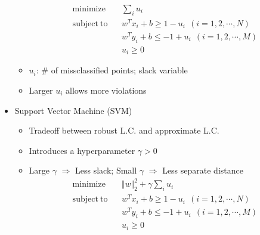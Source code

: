 \begin{itemize}
\begin{itemize}
\begin{equation}
\begin{aligned}
            \mathrm{minimize}~~&~~\sum_{i}u_i \\
            \mathrm{subject~to}~~&~~w^Tx_i+b\geq1-u_i~~(i=1,2,\cdots,N) \\
                &~~w^Ty_i+b\leq-1+u_i~~(i=1,2,\cdots,M) \\
                &~~u_i\geq 0
        \end{aligned}\end{equation}
        \item $u_i$: \# of missclassified points; slack variable
        \item Larger $u_i$ allows more violations
    \end{itemize}
    \item Support Vector Machine (SVM)
    \begin{itemize}
        \item Tradeoff between robust L.C. and approximate L.C.
        \item Introduces a hyperparameter $\gamma>0$
        \item Large $\gamma$ $\Rightarrow$ Less slack; Small $\gamma$ $\Rightarrow$ Less separate distance
        \begin{equation}\begin{aligned}
            \mathrm{minimize}~~&~~\Vert w\Vert_2^2+\gamma\sum_{i}u_i \\
            \mathrm{subject~to}~~&~~w^Tx_i+b\geq1-u_i~~(i=1,2,\cdots,N) \\
                &~~w^Ty_i+b\leq-1+u_i~~(i=1,2,\cdots,M) \\
                &~~u_i\geq0
        \end{aligned}\end{equation}
    \end{itemize}
\end{itemize}
\begin{figures}
\end{figures}

